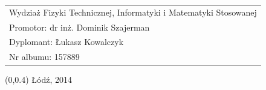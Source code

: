 \documentclass[12pt, oneside, a4paper]{mwbk}
\begin{document}
\begin{titlepage}
\begin{center}
\selectfont
\hspace{-1cm}
\begin{tabular}{l}
Wydziaż Fizyki Technicznej, Informatyki i Matematyki Stosowanej \\
Promotor: dr inż. Dominik Szajerman \\
Dyplomant: Łukasz Kowalczyk \\
Nr albumu: 157889
\end{tabular}
\end{center}
\vspace{-.5cm}
\begin{center}
\selectfont
\begin{textblock}{13}(0,0.4)
Łódź, 2014
\end{textblock}
\end{center}
\end{titlepage}

\tableofcontents



\listoffigures


\end{document}
